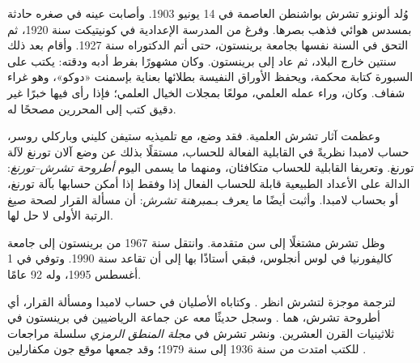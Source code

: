\documentclass[../../../include/open-logic-section]{subfiles}
\begin{document}



وُلد ألونزو تشرش بواشنطن العاصمة في 14 يونيو 1903. وأصابت عينه في صغره
حادثة بمسدس هوائي فذهب بصرها. وفرغ من المدرسة الإعدادية في كونيتيكت
سنة 1920، ثم التحق في السنة نفسها بجامعة برينستون، حتى أتم الدكتوراه
سنة 1927. وأقام بعد ذلك سنتين خارج البلاد، ثم عاد إلى برينستون. وكان
مشهورًا بفرط أدبه ودقته: يكتب على السبورة كتابة محكمة، ويحفظ الأوراق
النفيسة بطلائها بعناية بإسمنت «دوكو»، وهو غراء شفاف. وكان، وراء عمله
العلمي، مولعًا بمجلات الخيال العلمي؛ فإذا رأى فيها خبرًا غير دقيق كتب
إلى المحررين مصححًا له.

وعظمت آثار تشرش العلمية. فقد وضع، مع تلميذيه ستيفن كليني وباركلي روسر،
حساب لامبدا نظريةً في القابلية الفعالة للحساب، مستقلًا بذلك عن وضع آلان
تورنغ لآلة تورنغ. وتعريفا القابلية للحساب متكافئان، ومنهما ما يسمى
اليوم \emph{أطروحة تشرش--تورنغ}: الدالة على الأعداد الطبيعية قابلة
للحساب الفعال إذا وفقط إذا أمكن حسابها بآلة تورنغ، أو بحساب لامبدا.
وأثبت أيضًا ما يعرف بـ\emph{مبرهنة تشرش}: أن مسألة القرار لصحة صيغ
الرتبة الأولى لا حل لها.

وظل تشرش مشتغلًا إلى سن متقدمة. وانتقل سنة 1967 من برينستون إلى جامعة
كاليفورنيا في لوس أنجلوس، فبقي أستاذًا بها إلى أن تقاعد سنة 1990.
وتوفي في 1 أغسطس 1995، وله 92 عامًا.

\begin{reading}
لترجمة موجزة لتشرش انظر \citet{EndertonND}. وكتاباه الأصليان في حساب
لامبدا ومسألة القرار، أي أطروحة تشرش، هما
\citet{Church1936,Church1936a}. وسجل \citet{Aspray1984} حديثًا معه عن
جماعة الرياضيين في برينستون في ثلاثينيات القرن العشرين. ونشر تشرش في
\emph{مجلة المنطق الرمزي} سلسلة مراجعات للكتب امتدت من سنة 1936 إلى
سنة 1979؛ وقد جمعها موقع جون مكفارلين \citep{MacFarlane2015}.
\end{reading}
\end{document}
